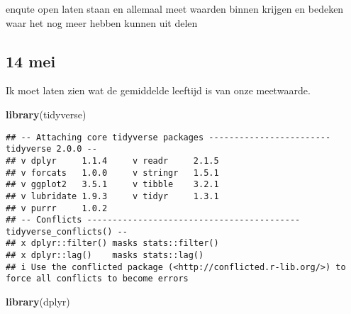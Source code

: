 \documentclass[
]{article}
\newenvironment{Shaded}{\begin{snugshade}}{\end{snugshade}}
\newcommand{\FunctionTok}[1]{\textcolor[rgb]{0.13,0.29,0.53}{\textbf{#1}}}
\newcommand{\NormalTok}[1]{#1}
\begin{document}
enqute open laten staan en allemaal meet waarden binnen krijgen en
bedeken waar het nog meer hebben kunnen uit delen

\subsection{14 mei}\label{mei-1}

Ik moet laten zien wat de gemiddelde leeftijd is van onze meetwaarde.

\begin{Shaded}
\begin{Highlighting}[]
\FunctionTok{library}\NormalTok{(tidyverse)}
\end{Highlighting}
\end{Shaded}

\begin{verbatim}
## -- Attaching core tidyverse packages ------------------------ tidyverse 2.0.0 --
## v dplyr     1.1.4     v readr     2.1.5
## v forcats   1.0.0     v stringr   1.5.1
## v ggplot2   3.5.1     v tibble    3.2.1
## v lubridate 1.9.3     v tidyr     1.3.1
## v purrr     1.0.2     
## -- Conflicts ------------------------------------------ tidyverse_conflicts() --
## x dplyr::filter() masks stats::filter()
## x dplyr::lag()    masks stats::lag()
## i Use the conflicted package (<http://conflicted.r-lib.org/>) to force all conflicts to become errors
\end{verbatim}

\begin{Shaded}
\begin{Highlighting}[]
\FunctionTok{library}\NormalTok{(dplyr)}
\end{Highlighting}
\end{Shaded}
\end{document}
